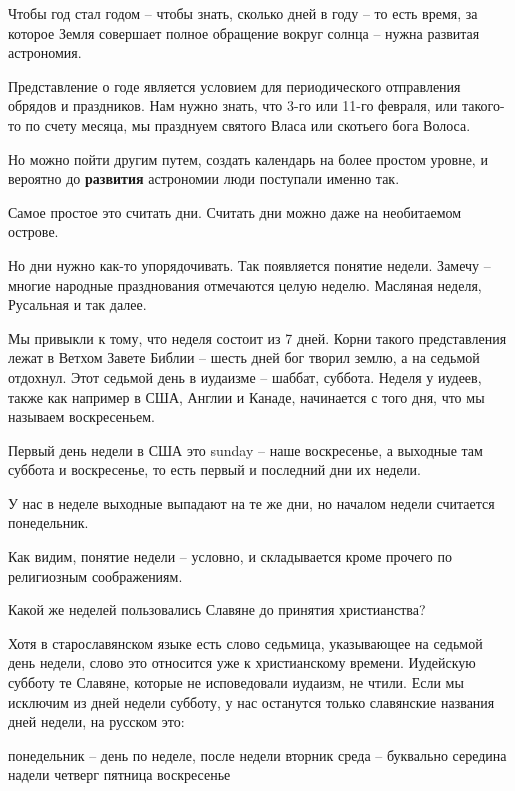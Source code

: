 \documentclass[a5paper,11pt,openany]{article}
\begin{document}
  Чтобы год стал годом – чтобы знать, сколько дней в году – то есть время, за которое Земля совершает полное обращение вокруг солнца – нужна развитая астрономия. 

   Представление о годе является условием для периодического отправления обрядов и праздников. Нам нужно знать, что 3-го или 11-го февраля, или такого-то по счету месяца, мы празднуем святого Власа или скотьего бога Волоса.

   Но можно пойти другим путем, создать календарь на более простом уровне, и вероятно до \textbf{развития} астрономии люди поступали именно так.

  Самое простое это считать дни. Считать дни можно даже на необитаемом острове.

    Но дни нужно как-то упорядочивать. Так появляется понятие недели. Замечу – многие народные празднования отмечаются целую неделю. Масляная неделя, Русальная и так далее.

Мы привыкли к тому, что неделя состоит из 7 дней. Корни такого представления лежат в Ветхом Завете Библии – шесть дней бог творил землю, а на седьмой отдохнул. Этот седьмой день в иудаизме – шаббат, суббота. Неделя у иудеев, также как например в США, Англии и Канаде, начинается с того дня, что мы называем воскресеньем. 

Первый день недели в США это sunday – наше воскресенье, а выходные там суббота и воскресенье, то есть первый и последний дни их недели.

У нас в неделе выходные выпадают на те же дни, но началом недели считается понедельник.

Как видим, понятие недели – условно, и складывается кроме прочего по религиозным соображениям.

Какой же неделей пользовались Славяне до принятия христианства?

Хотя в старославянском языке есть слово седьмица, указывающее на седьмой день недели, слово это относится уже к христианскому времени. Иудейскую субботу те Славяне, которые не исповедовали иудаизм, не чтили. Если мы исключим из дней недели субботу, у нас останутся только славянские названия дней недели, на русском это:\newline

\noindent понедельник – день по неделе, после недели\newline
вторник\newline
среда – буквально середина надели\newline
четверг\newline
пятница\newline
воскресенье\newline
\end{document}
